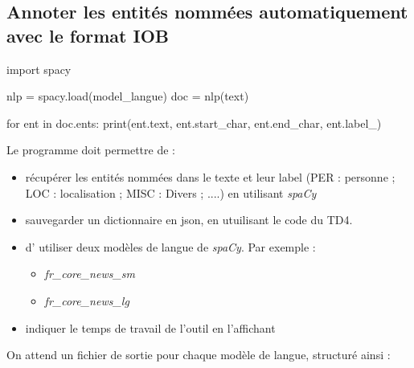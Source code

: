 \vspace{0.5cm}
\subsection{Annoter les entités nommées automatiquement avec le format IOB}
\vspace{0.5cm}

\vspace{0.5cm}

\begin{python}
import spacy

nlp = spacy.load(model_langue)
doc = nlp(text)

for ent in doc.ents:
    print(ent.text, ent.start_char, ent.end_char, ent.label_)
\end{python}

Le programme doit permettre de :

\begin{itemize}
    \item  récupérer les entités nommées dans le texte et leur label (PER : personne ; LOC : localisation ; MISC : Divers ; ....)   en utilisant \textit{spaCy }
    \item sauvegarder un dictionnaire en json, en utuilisant le code du TD4. 
 \item d' utiliser deux modèles de langue de \textit{spaCy}. Par exemple : 

    \begin{itemize}
    \item \textit{fr\_core\_news\_sm} 
    \item \textit {fr\_core\_news\_lg} 
\end{itemize}
\item indiquer le temps de travail de l'outil en l'affichant
\end{itemize}

On attend un fichier de sortie pour chaque modèle de langue, structuré ainsi :

 \begin{python}   
  
 \end{python}
    
   

